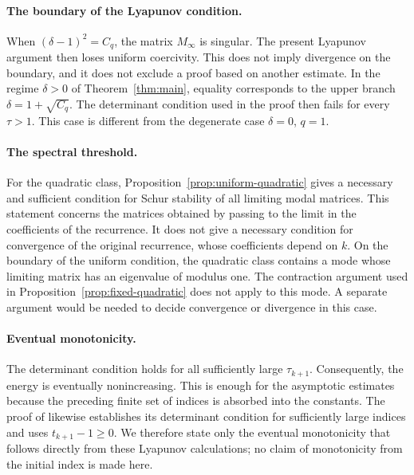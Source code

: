 \documentclass[11pt]{article}
\theoremstyle{plain}
\theoremstyle{definition}
\begin{document}
{
\paragraph{The boundary of the Lyapunov condition.}
When $(\delta-1)^2=C_q$, the matrix $M_\infty$ is singular. The present
Lyapunov argument then loses uniform coercivity. This does not imply
divergence on the boundary, and it does not exclude a proof based on another
estimate. In the regime $\delta>0$ of Theorem~\ref{thm:main}, equality
corresponds to the upper branch $\delta=1+\sqrt{C_q}$. The determinant
condition used in the proof then fails for every $\tau>1$. This case is
different from the degenerate case $\delta=0$, $q=1$.
}

{
\paragraph{The spectral threshold.}
For the quadratic class, Proposition~\ref{prop:uniform-quadratic} gives a
necessary and sufficient condition for Schur stability of all limiting modal
matrices. This statement concerns the matrices obtained by passing to the
limit in the coefficients of the recurrence. It does not give a necessary
condition for convergence of the original recurrence, whose coefficients
depend on $k$. On the boundary of the uniform condition, the quadratic class
contains a mode whose limiting matrix has an eigenvalue of modulus one. The
contraction argument used in Proposition~\ref{prop:fixed-quadratic} does not
apply to this mode. A separate argument would be needed to decide convergence
or divergence in this case.
}

\paragraph{Eventual monotonicity.}
The determinant condition holds for all sufficiently large
$\tau_{k+1}$. Consequently, the energy is eventually nonincreasing. This is
enough for the asymptotic estimates because the preceding finite set of
indices is absorbed into the constants. The proof of
\cite[Theorem~6]{AFCR2022} likewise establishes its
determinant condition for sufficiently large indices and uses
$t_{k+1}-1\geq0$. We therefore state only the eventual monotonicity that
follows directly from these Lyapunov calculations; no claim of monotonicity
from the initial index is made here.
\end{document}
